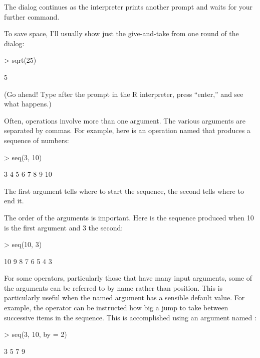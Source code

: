 \noindent The dialog continues as the interpreter prints another prompt and
waits for your further command.

To save space, I'll usually show just the give-and-take from one round
of the dialog:
\begin{Schunk}
\begin{Sinput}
> sqrt(25)
\end{Sinput}
\begin{Soutput}
[1] 5
\end{Soutput}
\end{Schunk}
(Go ahead!  Type  after the prompt in the R
interpreter, press ``enter,'' and see what happens.)

Often, operations involve more than one argument.  The various
arguments are separated by commas.  For example, here is an operation
named  
that produces a sequence of numbers:
\begin{Schunk}
\begin{Sinput}
> seq(3, 10)
\end{Sinput}
\begin{Soutput}
[1]  3  4  5  6  7  8  9 10
\end{Soutput}
\end{Schunk}

The first argument tells where to start the sequence, the second tells
where to end it.

The order of the arguments is important.  Here is the sequence
produced when 10 is the first argument and 3 the second:
\begin{Schunk}
\begin{Sinput}
> seq(10, 3)
\end{Sinput}
\begin{Soutput}
[1] 10  9  8  7  6  5  4  3
\end{Soutput}
\end{Schunk}

For some operators, particularly those that have many input arguments,
some of the arguments can be referred to by name rather than
position. This is particularly useful when the named argument has a
sensible default value.
For example, the  operator can be instructed how big a
jump to take between successive items in the sequence.  This is
accomplished using an argument named :
\begin{Schunk}
\begin{Sinput}
> seq(3, 10, by = 2)
\end{Sinput}
\begin{Soutput}
[1] 3 5 7 9
\end{Soutput}
\end{Schunk}

